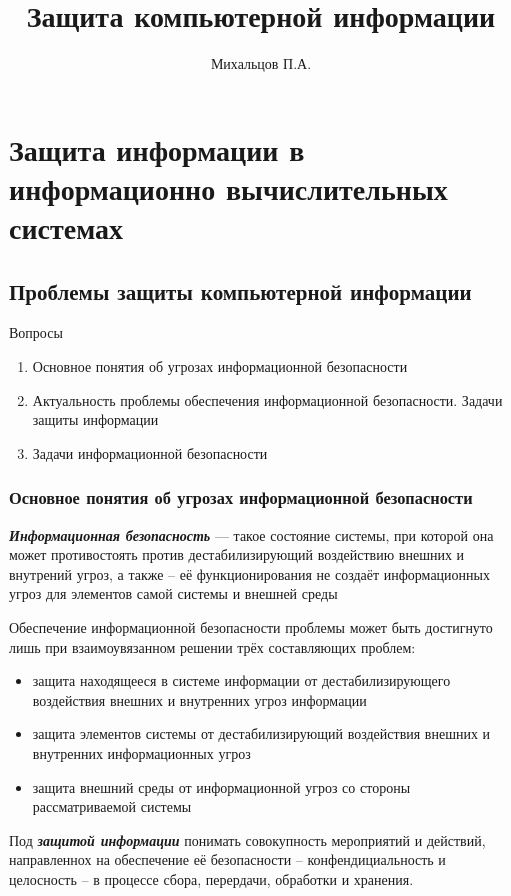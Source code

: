 \documentclass[a4paper,14pt]{extarticle}
\title{\textbf{Защита компьютерной информации}}
\author{Михальцов П.А.}
\begin{document}
	\maketitle
	\section{Защита информации в информационно вычислительных системах}
	\subsection{Проблемы защиты компьютерной информации}
	Вопросы 
	\begin{enumerate}
		\item Основное понятия об угрозах информационной безопасности
		\item Актуальность проблемы обеспечения информационной безопасности. Задачи защиты информации
		\item Задачи информационной безопасности
	\end{enumerate}
	\subsubsection{Основное понятия об угрозах информационной безопасности}
	\textbf{\textit{Информационная безопасность}} --- такое состояние системы, при которой она может противостоять против дестабилизирующий воздействию внешних и внутрений угроз, а также -- её функционирования не создаёт информационных угроз для элементов самой системы и внешней среды
	
	Обеспечение информационной безопасности проблемы может быть достигнуто лишь при взаимоувязанном решении трёх составляющих проблем:
	\begin{itemize}
		\item защита находящееся в системе информации от дестабилизирующего воздействия внешних и внутренних угроз информации
		\item защита элементов системы от дестабилизирующий воздействия внешних и внутренних информационных угроз 
		\item защита внешний среды от информационной угроз со стороны рассматриваемой системы 
	\end{itemize}

	\vspace{\baselineskip}
	Под \textbf{\textit{защитой информации}} понимать совокупность мероприятий и действий, направленнох на обеспечение её безопасности -- конфендициальность и целосность -- в процессе сбора, перердачи, обработки и хранения.
	
\end{document}
